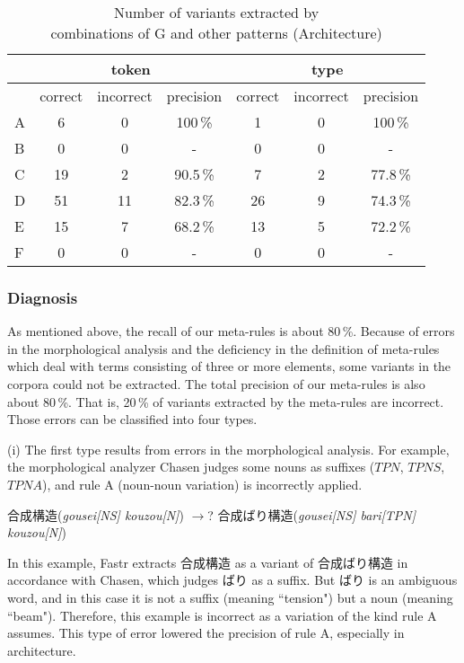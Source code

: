 \begin{table*}[htb]
\begin{center}
\begin{tabular}{l|ccc|ccc}
\hline
& \multicolumn{3}{|c}{token} & \multicolumn{3}{|c}{type}\\
\hline
& correct & incorrect & precision & correct & incorrect & precision\\
\hline
\hline
A & 6 & 0 & 100\,\% & 1 & 0 & 100\,\%\\
B & 0 & 0 & - & 0 & 0 & -\\
C & 19 & 2 & 90.5\,\% & 7 & 2 & 77.8\,\%\\
D & 51 & 11 & 82.3\,\% & 26 & 9 & 74.3\,\%\\
E & 15 & 7 & 68.2\,\% & 13 & 5 & 72.2\,\%\\
F & 0 & 0 & - & 0 & 0 & -\\
\hline
\end{tabular}

\end{center}
\caption{Number of variants extracted by \\ combinations of G and other patterns (Architecture)}
\end{table*}

\subsubsection{Diagnosis}

As mentioned above, the recall of our meta-rules is about 80\,\%. Because of errors in the morphological analysis and the deficiency in the definition of meta-rules which deal with terms consisting of three or more elements, some variants in the corpora could not be extracted. The total precision of our meta-rules is also about 80\,\%. That is, 20\,\% of variants extracted by the meta-rules are incorrect. Those errors can be classified into four types.

\vspace{5mm}
\noindent
(i) The first type results from errors in the morphological analysis. For example, the morphological analyzer Chasen judges some nouns as suffixes ($TPN$, $TPNS$, $TPNA$), and rule A (noun-noun variation) is incorrectly applied.

\vspace{5mm}
\noindent
合成構造({\it gousei[NS] kouzou[N]}) $\rightarrow$? 合成ばり構造({\it gousei[NS] bari[TPN] kouzou[N]})

\vspace{5mm}
\noindent
In this example, Fastr extracts 合成構造 as a variant of 合成ばり構造 in accordance with Chasen, which judges ばり as a suffix. But ばり is an ambiguous word, and in this case it is not a suffix (meaning ``tension") but a noun (meaning ``beam"). Therefore, this example is incorrect as a variation of the kind rule A assumes. This type of error lowered the precision of rule A, especially in architecture.


